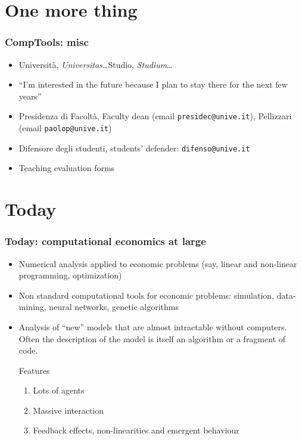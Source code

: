 \documentclass[ps,CFframes_inst]{beamer}
\begin{document}
\section{One more thing}
\begin{frame}
    \frametitle{CompTools: misc} 
    \begin{itemize}
	\item Universit\`a, \emph{Universitas}\ldots Studio,
	\emph{Studium}\ldots
	
	\item ``I'm interested in the future because I plan to stay
	there for the next few years''

	\item Presidenza di Facolt\`a, Faculty dean (email \texttt{presidec@unive.it}),
	Pellizzari (email \texttt{paolop@unive.it})

	\item Difensore degli studenti, students' defender:
	\texttt{difenso@unive.it}\\
	
	\item Teaching evaluation forms
\end{itemize}
\end{frame}

\section{Today}
\begin{frame}
    \frametitle{Today: computational economics at large} 
    \begin{itemize}
	\item Numerical analysis applied to economic problems (say,
	linear and non-linear programming, optimization)
	
	\item Non standard computational tools for economic problems:
	simulation, data-mining, neural networks, genetic algorithms
	
	\item Analysis of ``new'' models that are almost intractable
	without computers.  Often the description of the model is
	itself an algorithm or a fragment of code.
	
	\begin{block}{Features}
	    \begin{enumerate}
	        \item Lots of agents
	    
	        \item Massive interaction
	    
	        \item Feedback effects, non-linearities and emergent 
		behaviour
	    \end{enumerate}
       \end{block}	    

    \end{itemize}
\end{frame}
\end{document}

